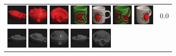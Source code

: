 \begin{figure}[tbp]
\begin{center}
\begin{tabular}{m{11cm} | m{3cm} |}
\includegraphics[width=1cm]{coil/beeld-22.eps} 
\includegraphics[width=1cm]{coil/beeld-20.eps} 
\includegraphics[width=1cm]{coil/beeld-23.eps} 
\includegraphics[width=1cm]{coil/beeld-32.eps} 
\includegraphics[width=1cm]{coil/beeld-36.eps} 
\includegraphics[width=1cm]{coil/beeld-33.eps} 
\includegraphics[width=1cm]{coil/beeld-39.eps} & {\scriptsize 0.0} \\ 
\includegraphics[width=1cm]{coil/beeld-24.eps} 
\includegraphics[width=1cm]{coil/beeld-25.eps} 
\includegraphics[width=1cm]{coil/beeld-28.eps} 
\includegraphics[width=1cm]{coil/beeld-27.eps} 
\includegraphics[width=1cm]{coil/beeld-26.eps} 

\end{tabular}
\end{center}
\end{figure}
